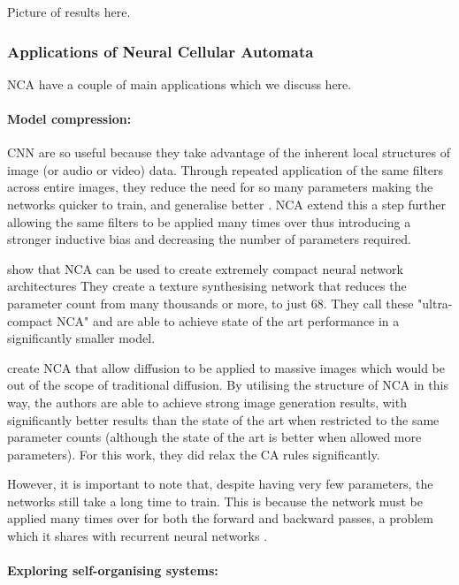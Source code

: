 \documentclass[12pt]{report}
\begin{document}
Picture of results here. 

\subsubsection{Applications of Neural Cellular Automata}

NCA have a couple of main applications which we discuss here. 

\paragraph{Model compression:}

CNN are so useful because they take advantage of the inherent local structures of image (or audio or video) data. Through repeated application of the same filters across entire images, they reduce the need for so many parameters making the networks quicker to train, and generalise better  \citep{LeCun2015DeepLearning}. NCA extend this a step further allowing the same filters to be applied many times over thus introducing a stronger inductive bias and decreasing the number of parameters required. 

\cite{mordvintsev2021munca} show that NCA can be used to create extremely compact neural network architectures They create a texture synthesising network that reduces the parameter count from many thousands or more, to just 68. They call these "ultra-compact NCA" and are able to achieve state of the art performance in a significantly smaller model. 

\cite{kalkhof2024frequencytime} create NCA that allow diffusion to be applied to massive images which would be out of the scope of traditional diffusion. By utilising the structure of NCA in this way, the authors are able to achieve strong image generation results, with significantly better results than the state of the art when restricted to the same parameter counts (although the state of the art is better when allowed more parameters). For this work, they did relax the CA rules significantly. 

However, it is important to note that, despite having very few parameters, the networks still take a long time to train. This is because the network must be applied many times over for both the forward and backward passes, a problem which it shares with recurrent neural networks \cite{GoodBengCour16}.

\paragraph{Exploring self-organising systems:} 
\end{document}
